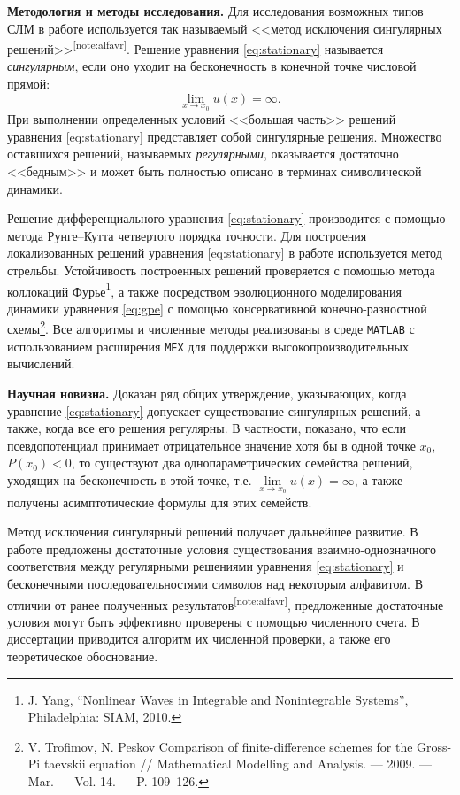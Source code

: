 \documentclass[candidate, href, colorlinks]{disser}
\begin{document}
\textbf{Методология и методы исследования.}
Для исследования возможных типов СЛМ в работе используется так называемый <<метод исключения сингулярных решений>>\textsuperscript{\ref{note:alfavr}}.
Решение уравнения \eqref{eq:stationary} называется {\it сингулярным}, если оно уходит на бесконечность в конечной точке числовой прямой:
\begin{equation}
	\lim \limits_{x \to x_0} u(x) = \infty.
\end{equation}
При выполнении определенных условий <<большая часть>> решений уравнения \eqref{eq:stationary} представляет собой сингулярные решения.
Множество оставшихся решений, называемых {\it регулярными}, оказывается достаточно <<бедным>> и может быть полностью описано в терминах символической динамики.

Решение дифференциального уравнения \eqref{eq:stationary} производится с помощью метода Рунге--Кутта четвертого порядка точности.
Для построения локализованных решений уравнения \eqref{eq:stationary} в работе используется метод стрельбы.
Устойчивость построенных решений проверяется с помощью метода коллокаций Фурье\footnote{J. Yang, ``Nonlinear Waves in Integrable and Nonintegrable Systems'', Philadelphia: SIAM, 2010.}, а также посредством эволюционного моделирования динамики уравнения \eqref{eq:gpe} с помощью консервативной конечно-разностной схемы\footnote{V. Trofimov, N. Peskov Comparison of finite-difference schemes for the Gross-Pi­ taevskii equation // Mathematical Modelling and Analysis. — 2009. — Mar. — Vol. 14. — P. 109–126.}.
Все алгоритмы и численные методы реализованы в среде {\tt MATLAB} с использованием расширения {\tt MEX} для поддержки высокопроизводительных вычислений.

\textbf{Научная новизна.}
Доказан ряд общих утверждение, указывающих, когда уравнение \eqref{eq:stationary} допускает существование сингулярных решений, а также, когда все его решения регулярны.
В частности, показано, что если псевдопотенциал принимает отрицательное значение хотя бы в одной точке $x_0$, $P(x_0) < 0$, то существуют два однопараметрических семейства решений, уходящих на бесконечность в этой точке, т.е. $\lim \limits_{x \to x_0} u(x) = \infty$, а также получены асимптотические формулы для этих семейств.

Метод исключения сингулярный решений получает дальнейшее развитие.
В работе предложены достаточные условия существования взаимно-однозначного соответствия между регулярными решениями уравнения \eqref{eq:stationary} и бесконечными последовательностями символов над некоторым алфавитом.
В отличии от ранее полученных результатов\textsuperscript{\ref{note:alfavr}}, предложенные достаточные условия могут быть эффективно проверены с помощью численного счета.
В диссертации приводится алгоритм их численной проверки, а также его теоретическое обоснование.
\end{document}
